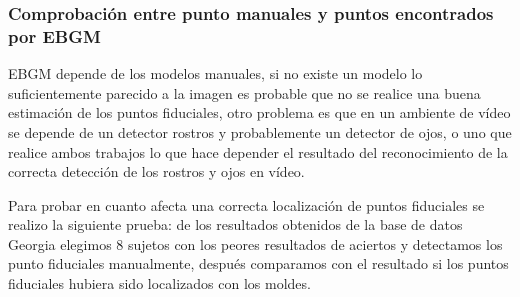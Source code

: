 \subsubsection{Comprobación entre punto manuales y puntos encontrados por \ac{EBGM}}


\ac{EBGM} depende de los modelos manuales, si no existe un modelo lo suficientemente parecido a la imagen es probable que no se realice una buena estimación de los puntos fiduciales, otro problema es que en un ambiente de vídeo se depende de un detector rostros y probablemente un detector de ojos, o uno que realice ambos trabajos lo que hace depender el resultado del reconocimiento de la correcta detección de los rostros y ojos en vídeo.

Para probar en cuanto afecta una correcta localización de puntos fiduciales se realizo la siguiente prueba: de los resultados obtenidos de la base de datos Georgia elegimos 8 sujetos con los peores resultados de aciertos y detectamos los punto fiduciales manualmente, después comparamos con el resultado si los puntos fiduciales hubiera sido localizados con los moldes.



